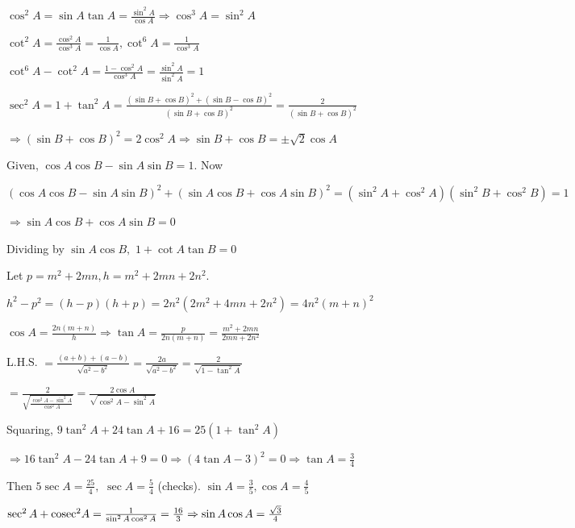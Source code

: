 \item $\cos^2 A = \sin A\tan A = \frac{\sin^2 A}{\cos A} \Rightarrow \cos^3 A = \sin^2 A$

    $\cot^2 A = \frac{\cos^2 A}{\cos^3 A} = \frac{1}{\cos A}, \cot^6 A = \frac{1}{\cos^3 A}$

    $\cot^6 A - \cot^2 A = \frac{1 - \cos^2 A}{\cos^3 A} = \frac{\sin^2 A}{\sin^2 A} = 1$

\item $\sec^2 A = 1 + \tan^2 A = \frac{(\sin B + \cos B)^2 + (\sin B - \cos B)^2}{(\sin B + \cos B)^2} = \frac{2}{(\sin B + \cos
    B)^2}$

    $\Rightarrow (\sin B + \cos B)^2 = 2\cos^2 A \Rightarrow \sin B + \cos B = \pm\sqrt{2}\cos A$

\item Given, $\cos A\cos B - \sin A\sin B = 1$. Now

    $(\cos A\cos B - \sin A\sin B)^2 + (\sin A\cos B + \cos A\sin B)^2 = (\sin^2 A + \cos^2 A)(\sin^2 B + \cos^2 B) = 1$

    $\Rightarrow \sin A\cos B + \cos A\sin B = 0$

    Dividing by $\sin A\cos B,$ $1 + \cot A\tan B = 0$

\item Let $p = m^2 + 2mn, h = m^2 + 2mn + 2n^2$.

    $h^2 - p^2 = (h - p)(h + p) = 2n^2(2m^2 + 4mn + 2n^2) = 4n^2(m + n)^2$

    $\cos A = \frac{2n(m + n)}{h} \Rightarrow \tan A = \frac{p}{2n(m + n)} = \frac{m^2 + 2mn}{2mn + 2n^2}$

\item L.H.S. $= \frac{(a + b) + (a - b)}{\sqrt{a^2 - b^2}} = \frac{2a}{\sqrt{a^2 - b^2}} = \frac{2}{\sqrt{1 - \tan^2 A}}$

    $= \frac{2}{\sqrt{\frac{\cos^2 A - \sin^2 A}{\cos^2 A}}} = \frac{2\cos A}{\sqrt{\cos^2 A - \sin^2 A}}$

\item Squaring, $9\tan^2 A + 24\tan A + 16 = 25(1 + \tan^2 A)$

    $\Rightarrow 16\tan^2 A - 24\tan A + 9 = 0 \Rightarrow (4\tan A - 3)^2 = 0 \Rightarrow \tan A = \frac{3}{4}$

    Then $5\sec A = \frac{25}{4},$ $\sec A = \frac{5}{4}$ (checks). $\sin A = \frac{3}{5}, \cos A = \frac{4}{5}$

\item $\sec^2 A + {\rm cosec}^2 A = \frac{1}{\sin^2 A\cos^2 A} = \frac{16}{3} \Rightarrow \sin A\cos A = \frac{\sqrt{3}}{4}$

